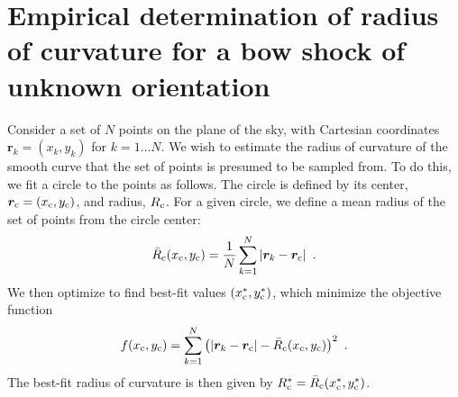 \section{Empirical determination of radius of curvature for a bow shock of unknown orientation}
\label{app:rcurv-empirical}

Consider a set of \(N\) points on the plane of the sky, with Cartesian
coordinates \(\bm{r}_k = (x_k, y_k)\) for \(k = 1 \dots N\).  We wish
to estimate the radius of curvature of the smooth curve that the set
of points is presumed to be sampled from.  To do this, we fit a circle
to the points as follows.  The circle is defined by its center,
\(\bm{r}_{\mathrm{c}} = (x_{\mathrm{c}}, y_{\mathrm{c}})\), and radius, \(R_{\mathrm{c}}\).  For a
given circle, we define a mean radius of the set of points from the
circle center:
\begin{equation}
  \label{eq:rcurv-mean-radius}
  \bar{R}_{\mathrm{c}}(x_{\mathrm{c}}, y_{\mathrm{c}}) = \frac{1}{N}  \sum_{k = 1}^{N} \left\lvert\bm{r}_k - \bm{r}_{\mathrm{c}}\right\rvert  \ .
\end{equation}
We then optimize
to find best-fit values \((x_{\mathrm{c}}^*, y_{\mathrm{c}}^*)\), which minimize the
objective function
\begin{equation}
  \label{eq:rcurv-objective-function}
  f(x_{\mathrm{c}}, y_{\mathrm{c}}) = \sum_{k = 1}^{N} \left(
    \lvert\bm{r}_k - \bm{r}_{\mathrm{c}}\rvert  - \bar{R}_{\mathrm{c}} (x_{\mathrm{c}}, y_{\mathrm{c}}) \right)^2 \ .
\end{equation}
The best-fit radius of curvature is then given by
\(R_{\mathrm{c}}^* = \bar{R}_{\mathrm{c}}(x_{\mathrm{c}}^*, y_{\mathrm{c}}^*)\).

